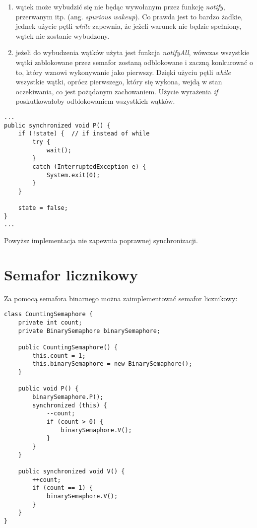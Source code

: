 \documentclass{article}
\begin{document}
\begin{enumerate}
    \item
    wątek może wybudzić się nie będąc wywołanym przez funkcję \textit{notify}, przerwanym itp. (ang. \textit{spurious wakeup}).
    Co prawda jest to bardzo żadkie, jednek użycie pętli \textit{while} zapewnia, że jeżeli warunek
    nie będzie spełniony, wątek nie zostanie wybudzony.
    \item
    jeżeli do wybudzenia wątków użyta jest funkcja \textit{notifyAll}, wówczas wszystkie wątki zablokowane
    przez semafor zostaną odblokowane i zaczną konkurować o to, który wznowi wykonywanie jako pierwszy.
    Dzięki użyciu pętli \textit{while} wszystkie wątki, oprócz pierwszego, który się wykona, wejdą w
    stan oczekiwania, co jest pożądanym zachowaniem. Użycie wyrażenia \textit{if} poskutkowałoby odblokowaniem
    wszystkich wątków.
\end{enumerate}

\begin{verbatim}
...
public synchronized void P() {
    if (!state) {  // if instead of while
        try {
            wait();  
        }
        catch (InterruptedException e) {
            System.exit(0);
        }
    }

    state = false;
}
...
\end{verbatim}

Powyższ implementacja nie zapewnia poprawnej synchronizacji.

\section{Semafor licznikowy}

Za pomocą semafora binarnego można zaimplementować semafor licznikowy:

\begin{verbatim}
class CountingSemaphore {
    private int count;
    private BinarySemaphore binarySemaphore;

    public CountingSemaphore() {
        this.count = 1;
        this.binarySemaphore = new BinarySemaphore();
    }

    public void P() {
        binarySemaphore.P();
        synchronized (this) {
            --count;
            if (count > 0) {
                binarySemaphore.V();
            }
        }
    }
    
    public synchronized void V() {
        ++count;
        if (count == 1) {
            binarySemaphore.V();
        }
    }
}        
\end{verbatim}
\end{document}
